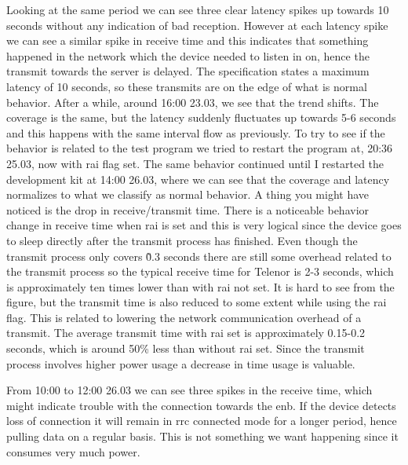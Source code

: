 \documentclass[USenglish]{ifimaster}  %
\begin{document}
Looking at the same period we can see three clear latency spikes up towards 10 seconds without any indication of bad reception. However at each latency spike we can see a similar spike in receive time and this indicates that something happened in the network which the device needed to listen in on, hence the transmit towards the server is delayed. The specification states a maximum latency of 10 seconds, so these transmits are on the edge of what is normal behavior. After a while, around 16:00 23.03, we see that the trend shifts. The coverage is the same, but the latency suddenly fluctuates up towards 5-6 seconds and this happens with the same interval flow as previously. To try to see if the behavior is related to the test program we tried to restart the program at, 20:36 25.03, now with \acrshort{rai} flag set. The same behavior continued until I restarted the development kit at 14:00 26.03, where we can see that the coverage and latency normalizes to what we classify as normal behavior. A thing you might have noticed is the drop in receive/transmit time. There is a noticeable behavior change in receive time when \acrshort{rai} is set and this is very logical since the device goes to sleep directly after the transmit process has finished. Even though the transmit process only covers \~0.3 seconds there are still some overhead related to the transmit process so the typical receive time for Telenor is 2-3 seconds, which is approximately ten times lower than with \acrshort{rai} not set. It is hard to see from the figure, but the transmit time is also reduced to some extent while using the \acrshort{rai} flag. This is related to lowering the network communication overhead of a transmit. The average transmit time with \acrshort{rai} set is approximately 0.15-0.2 seconds, which is around 50\% less than without \acrshort{rai} set. Since the transmit process involves higher power usage a decrease in time usage is valuable.

From 10:00 to 12:00 26.03 we can see three spikes in the receive time, which might indicate trouble with the connection towards the \acrshort{enb}. If the device detects loss of connection it will remain in \acrshort{rrc} connected mode for a longer period, hence pulling data on a regular basis. This is not something we want happening since it consumes very much power.
\end{document}

